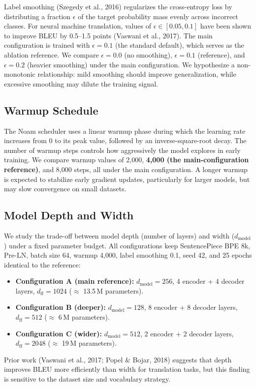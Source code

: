 \documentclass[10pt]{article}
\begin{document}
Label smoothing (Szegedy et al., 2016) regularizes the cross-entropy loss by distributing a fraction $\epsilon$ of the target probability mass evenly across incorrect classes. For neural machine translation, values of $\epsilon \in [0.05, 0.1]$ have been shown to improve BLEU by 0.5--1.5 points (Vaswani et al., 2017). The main configuration is trained with $\epsilon = 0.1$ (the standard default), which serves as the ablation reference. We compare $\epsilon = 0.0$ (no smoothing), $\epsilon = 0.1$ (reference), and $\epsilon = 0.2$ (heavier smoothing) under the main configuration. We hypothesize a non-monotonic relationship: mild smoothing should improve generalization, while excessive smoothing may dilute the training signal.

\subsection{Warmup Schedule}

The Noam scheduler uses a linear warmup phase during which the learning rate increases from 0 to its peak value, followed by an inverse-square-root decay. The number of warmup steps controls how aggressively the model explores in early training. We compare warmup values of 2{,}000, \textbf{4{,}000 (the main-configuration reference)}, and 8{,}000 steps, all under the main configuration. A longer warmup is expected to stabilize early gradient updates, particularly for larger models, but may slow convergence on small datasets.

\subsection{Model Depth and Width}

We study the trade-off between model depth (number of layers) and width ($d_{\text{model}}$) under a fixed parameter budget. All configurations keep SentencePiece BPE 8k, Pre-LN, batch size 64, warmup 4{,}000, label smoothing 0.1, seed 42, and 25 epochs identical to the reference:
\begin{itemize}
\item \textbf{Configuration A (main reference):} $d_{\text{model}}=256$, 4 encoder + 4 decoder layers, $d_{\text{ff}}=1024$ ($\approx$ 13.5\,M parameters).
\item \textbf{Configuration B (deeper):} $d_{\text{model}}=128$, 8 encoder + 8 decoder layers, $d_{\text{ff}}=512$ ($\approx$ 6\,M parameters).
\item \textbf{Configuration C (wider):} $d_{\text{model}}=512$, 2 encoder + 2 decoder layers, $d_{\text{ff}}=2048$ ($\approx$ 19\,M parameters).
\end{itemize}
Prior work (Vaswani et al., 2017; Popel \& Bojar, 2018) suggests that depth improves BLEU more efficiently than width for translation tasks, but this finding is sensitive to the dataset size and vocabulary strategy.
\end{document}
